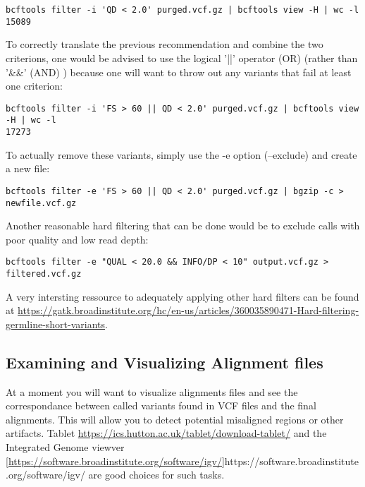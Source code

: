 \begin{verbatim}
bcftools filter -i 'QD < 2.0' purged.vcf.gz | bcftools view -H | wc -l
15089
\end{verbatim}


To correctly translate the previous recommendation and combine the two criterions, one would be advised to use the logical '||' operator (OR) (rather than '\&\&' (AND) ) because one will want to throw out any variants that fail at least one criterion:

\begin{verbatim}
bcftools filter -i 'FS > 60 || QD < 2.0' purged.vcf.gz | bcftools view -H | wc -l
17273
\end{verbatim}


To actually remove these variants, simply use the -e option (--exclude) and create a new file:

\begin{verbatim}
bcftools filter -e 'FS > 60 || QD < 2.0' purged.vcf.gz | bgzip -c > newfile.vcf.gz
\end{verbatim}


Another reasonable hard filtering that can be done would be to exclude calls with poor quality and low read depth:

\begin{verbatim}
bcftools filter -e "QUAL < 20.0 && INFO/DP < 10" output.vcf.gz > filtered.vcf.gz
\end{verbatim}

A very intersting ressource to adequately applying other hard filters can be found at \href{https://gatk.broadinstitute.org/hc/en-us/articles/360035890471-Hard-filtering-germline-short-variants}{https://gatk.broadinstitute.org/hc/en-us/articles/360035890471-Hard-filtering-germline-short-variants}.




\subsection{Examining and Visualizing Alignment files}

At a moment you will want to visualize alignments files and see the correspondance between called variants found in VCF files and the final alignments. This will allow you to detect potential misaligned regions or other artifacts. Tablet \href{https://ics.hutton.ac.uk/tablet/download-tablet/}{https://ics.hutton.ac.uk/tablet/download-tablet/} and the Integrated Genome viewver \ref{https://software.broadinstitute.org/software/igv/}{https://software.broadinstitute.org/software/igv/} are good choices for such tasks.

